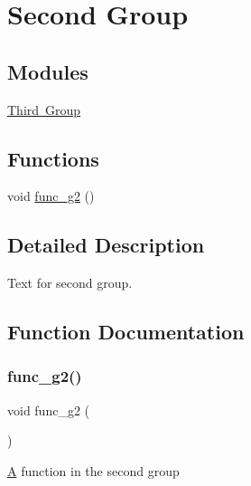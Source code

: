 \hypertarget{group__g2}{}\section{Second Group}
\label{group__g2}
\subsection*{Modules}
\begin{DoxyCompactItemize}
\item 
\mbox{\hyperlink{group__g3}{Third Group}}
\end{DoxyCompactItemize}
\subsection*{Functions}
\begin{DoxyCompactItemize}
\item 
void \mbox{\hyperlink{group__g2_gafd310bbec27993e80a5dbaf6c54d5e0b}{func\+\_\+g2}} ()
\end{DoxyCompactItemize}


\subsection{Detailed Description}
Text for second group. 

\subsection{Function Documentation}
\mbox{\label{group__g2_gafd310bbec27993e80a5dbaf6c54d5e0b}} 
\subsubsection{\texorpdfstring{func\_g2()}{func\_g2()}}
{\footnotesize\ttfamily void func\+\_\+g2 (\begin{DoxyParamCaption}{ }\end{DoxyParamCaption})}

\mbox{\hyperlink{class_a}{A}} function in the second group 